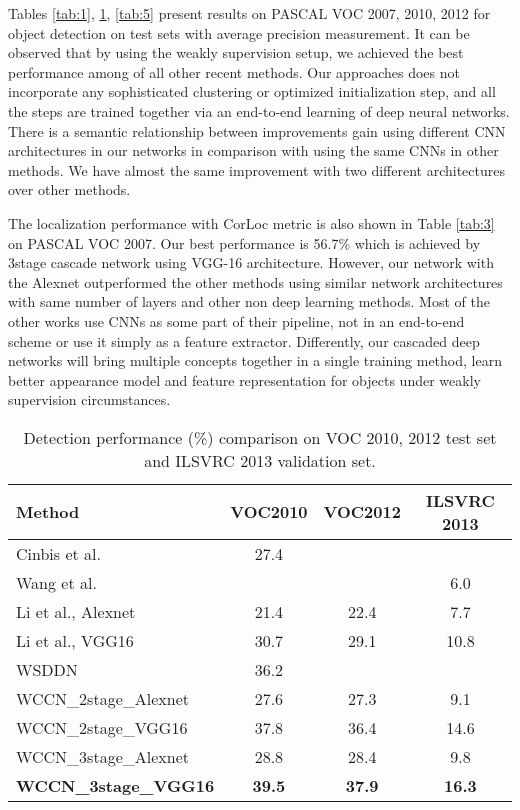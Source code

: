 \documentclass[10pt,twocolumn,letterpaper]{article}
\begin{document}
Tables \ref{tab:1}, \ref{tab:4}, \ref{tab:5} present results on PASCAL VOC 2007, 2010, 2012 for object detection on test sets with average precision measurement. It can be observed that by using the weakly supervision setup, we achieved the best performance among of all other recent methods. Our approaches does not incorporate any sophisticated clustering or optimized initialization step, and all the steps are trained together via an end-to-end learning of deep neural networks. There is a semantic relationship between improvements gain using different CNN architectures in our networks in comparison with using the same CNNs in other methods. We have almost the same improvement with two different architectures over other methods.

The localization performance with {CorLoc} metric is also shown in Table \ref{tab:3} on PASCAL VOC 2007. Our best performance is 56.7\% which is achieved by 3stage cascade network using VGG-16 architecture. However, our network with the Alexnet outperformed the other methods using similar network architectures with same number of layers and other non deep learning methods. Most of the other works use CNNs as some part of their pipeline, not in an end-to-end scheme or use it simply as a feature extractor. Differently, our cascaded deep networks will bring multiple concepts together in a single training method, learn better appearance model and feature representation for objects under weakly supervision circumstances.

\begin{table}[htb] 
\begin{center}
\resizebox{8.4cm}{!} {
\begin{tabular}{|l|c|c|c|}
\hline 
Method &  VOC2010 & VOC2012 & ILSVRC 2013  \\

\hline\hline
Cinbis et al. \cite{cinbis} & 27.4&  &  \\
Wang et al. \cite{wang14}& &   & 6.0 \\
Li et al., Alexnet \cite{li16}& 21.4& 22.4 & 7.7  \\
Li et al., VGG16 \cite{li16} & 30.7& 29.1 & 10.8 \\
WSDDN \cite{bilen16} & 36.2&   &  \\
\hline
WCCN\_2stage\_Alexnet& 27.6 & 27.3 & 9.1 \\
{WCCN\_2stage\_VGG16}& {37.8}& {36.4}  & {14.6}\\
{WCCN\_3stage\_Alexnet}& {28.8}& {28.4}  & {9.8}\\
\textbf{WCCN\_3stage\_VGG16}& \textbf{39.5}& \textbf{37.9}  & \textbf{16.3}\\
\hline
\end{tabular}}
\end{center}
\caption{Detection performance (\%) comparison on VOC 2010, 2012 test set and ILSVRC 2013 validation set.}
  \label{tab:4}
\end{table}
\end{document}

